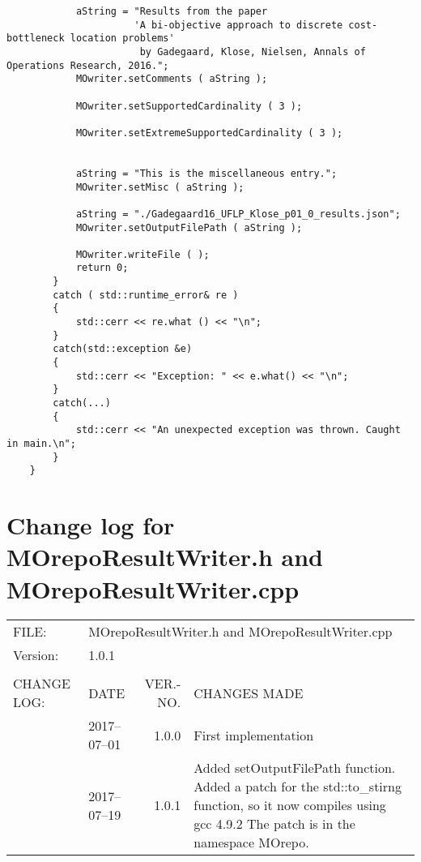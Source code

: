 \begin{lstlisting}
            aString = "Results from the paper 
                      'A bi-objective approach to discrete cost-bottleneck location problems' 
                       by Gadegaard, Klose, Nielsen, Annals of Operations Research, 2016.";
            MOwriter.setComments ( aString );

            MOwriter.setSupportedCardinality ( 3 );

            MOwriter.setExtremeSupportedCardinality ( 3 );


            aString = "This is the miscellaneous entry.";
            MOwriter.setMisc ( aString );

            aString = "./Gadegaard16_UFLP_Klose_p01_0_results.json";
            MOwriter.setOutputFilePath ( aString );

            MOwriter.writeFile ( );
            return 0;
        }
        catch ( std::runtime_error& re )
        {
            std::cerr << re.what () << "\n";
        }
        catch(std::exception &e)
        {
            std::cerr << "Exception: " << e.what() << "\n";
        }
        catch(...)
        {
            std::cerr << "An unexpected exception was thrown. Caught in main.\n";
        }
    }
  \end{lstlisting}


 
 \section{Change log for MOrepoResultWriter.h and MOrepoResultWriter.cpp}
 \begin{center}
     \begin{tabularx}{\textwidth}{llr X}\toprule
        FILE:          &   \multicolumn{3}{l}{MOrepoResultWriter.h and MOrepoResultWriter.cpp}\\
        Version:       &   \multicolumn{3}{l}{1.0.1}\\
        \cmidrule{1-3}\\
        CHANGE LOG:    &   DATE         &   VER.-NO.    &   CHANGES MADE\\ \midrule
                       &   2017--07--01    &   1.0.0       & First implementation\\
                        &   2017--07--19    &   1.0.1       & Added setOutputFilePath function. 
                                                          Added a patch for the std::to\_stirng function, so it now compiles using gcc 4.9.2
                                                          The patch is in the namespace MOrepo.\\\bottomrule
     \end{tabularx}
 \end{center}
  